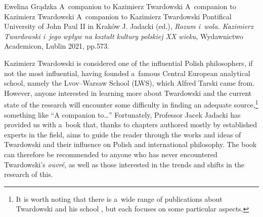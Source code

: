 \begin{newrevengenv}{Ewelina Grądzka}
	{A~companion to Kazimierz Twardowski}
	{A~companion to Kazimierz Twardowski}
	{A~companion to Kazimierz Twardowski}
	{Pontifical University of John Paul II in Kraków}
	{J. Jadacki (ed.), \textit{Rozum i~wola. Kazimierz Twardowski i~jego wpływ na kształt kultury polskiej XX wieku}, Wydawnictwo Academicon, Lublin 2021, pp.573.}




Kazimierz Twardowski is considered one of the influential Polish philosophers, if not the most influential, having founded a~famous Central European analytical school, namely the Lvov–Warsaw School (LWS), which Alfred Tarski came from. However, anyone interested in learning more about Twardowski and the current state of the research will encounter some difficulty in finding an adequate source,\footnote{It is worth noting that there is a~wide range of publications about Twardowski and his school
\parencites[e.g.,][]{wolenski_filozoficzna_1985}{wolenski_logic_1989}{poli_polish_1993}{brandl_actions_1999}{chybinska_tradition_2016}{brozek_significance_2017}{drabarek_interdisciplinary_2019},
but each focuses on some particular aspects. } something like ``A companion to…'' Fortunately, Professor Jacek Jadacki has provided us with a~book that, thanks to chapters authored mostly by established experts in the field, aims to guide the reader through the works and ideas of Twardowski and their influence on Polish and international philosophy. The book can therefore be recommended to anyone who has never encountered Twardowski's \textit{ouvré}, as well as those interested in the trends and shifts in the research of this.


\end{newrevengenv}
